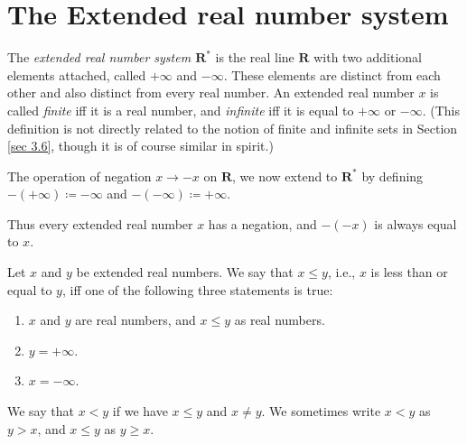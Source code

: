 \section{The Extended real number system}\label{sec 6.2}

\begin{definition}\label{6.2.1}
      The \emph{extended real number system \(\mathbf{R}^*\)} is the real line \(\mathbf{R}\) with two additional elements attached, called \(+\infty\) and \(-\infty\).
      These elements are distinct from each other and also distinct from every real number.
      An extended real number \(x\) is called \emph{finite} iff it is a real number, and \emph{infinite} iff it is equal to \(+\infty\) or \(-\infty\).
      (This definition is not directly related to the notion of finite and infinite sets in Section \ref{sec 3.6}, though it is of course similar in spirit.)
\end{definition}

\begin{definition}\label{6.2.2}
      The operation of negation \(x \to -x\) on \(\mathbf{R}\), we now extend to \(\mathbf{R}^*\) by defining \(-(+\infty) \coloneqq -\infty\) and \(-(-\infty) \coloneqq +\infty\).
\end{definition}

\begin{note}
      Thus every extended real number \(x\) has a negation, and \(-(-x)\) is always equal to \(x\).
\end{note}

\begin{definition}\label{6.2.3}
      Let \(x\) and \(y\) be extended real numbers.
      We say that \(x \leq y\), i.e., \(x\) is less than or equal to \(y\), iff one of the following three statements is true:
      \begin{enumerate}
            \item \(x\) and \(y\) are real numbers, and \(x \leq y\) as real numbers.
            \item \(y = +\infty\).
            \item \(x = -\infty\).
      \end{enumerate}
      We say that \(x < y\) if we have \(x \leq y\) and \(x \neq y\).
      We sometimes write \(x < y\) as \(y > x\), and \(x \leq y\) as \(y \geq x\).
\end{definition}

